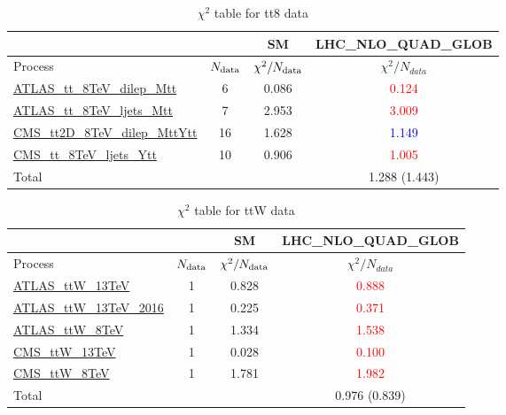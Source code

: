 \documentclass{article}
\begin{document}
\begin{table}[H]
\centering
\begin{tabular}{|l|c|c|c|}
\hline
 \multicolumn{2}{|c|}{} & SM& LHC_NLO_QUAD_GLOB\\ \hline
Process & $N_{\rm data}$ & $\chi^ 2/N_{\rm data}$& $\chi^ 2/N_{data}$\\ \hline
\href{https://arxiv.org}{ATLAS_tt_8TeV_dilep_Mtt} & 6 & 0.086 & \textcolor{red}                            {0.124} \\ \hline
\href{https://arxiv.org}{ATLAS_tt_8TeV_ljets_Mtt} & 7 & 2.953 & \textcolor{red}                            {3.009} \\ \hline
\href{https://arxiv.org}{CMS_tt2D_8TeV_dilep_MttYtt} & 16 & 1.628 & \textcolor{blue}                            {1.149} \\ \hline
\href{https://arxiv.org}{CMS_tt_8TeV_ljets_Ytt} & 10 & 0.906 & \textcolor{red}                            {1.005} \\ \hline
\hline Total & &  & 1.288 (1.443) \\ \hline
\end{tabular}
\caption{$\chi^2$ table for tt8 data}
\end{table}
\begin{table}[H]
\centering
\begin{tabular}{|l|c|c|c|}
\hline
 \multicolumn{2}{|c|}{} & SM& LHC_NLO_QUAD_GLOB\\ \hline
Process & $N_{\rm data}$ & $\chi^ 2/N_{\rm data}$& $\chi^ 2/N_{data}$\\ \hline
\href{https://arxiv.org}{ATLAS_ttW_13TeV} & 1 & 0.828 & \textcolor{red}                            {0.888} \\ \hline
\href{https://arxiv.org}{ATLAS_ttW_13TeV_2016} & 1 & 0.225 & \textcolor{red}                            {0.371} \\ \hline
\href{https://arxiv.org}{ATLAS_ttW_8TeV} & 1 & 1.334 & \textcolor{red}                            {1.538} \\ \hline
\href{https://arxiv.org}{CMS_ttW_13TeV} & 1 & 0.028 & \textcolor{red}                            {0.100} \\ \hline
\href{https://arxiv.org}{CMS_ttW_8TeV} & 1 & 1.781 & \textcolor{red}                            {1.982} \\ \hline
\hline Total & &  & 0.976 (0.839) \\ \hline
\end{tabular}
\caption{$\chi^2$ table for ttW data}
\end{table}
\end{document}
